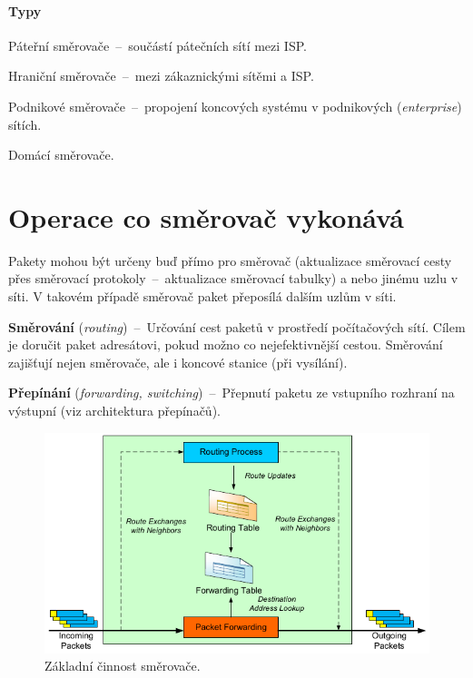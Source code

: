 \paragraph*{Typy} \begin{compactitem}
    \item Páteřní směrovače~--~součástí pátečních sítí mezi ISP.
    \item Hraniční směrovače~--~mezi zákaznickými sítěmi a ISP.
    \item Podnikové směrovače~--~propojení koncových systému v podnikových (\textit{enterprise}) sítích.
    \item Domácí směrovače.
\end{compactitem}


\section{Operace co směrovač vykonává}

Pakety mohou být určeny buď přímo pro směrovač (aktualizace směrovací cesty přes směrovací protokoly~--~aktualizace směrovací tabulky) a nebo jinému uzlu v síti. V takovém případě směrovač paket přeposílá dalším uzlům v síti.

\begin{compactitem}
    \item \textbf{Směrování} (\textit{routing})~--~Určování cest paketů v prostředí počítačových sítí. Cílem je doručit paket adresátovi, pokud možno co nejefektivnější cestou. Směrování zajišťují nejen směrovače, ale i koncové stanice (při vysílání).
    \item \textbf{Přepínání} (\textit{forwarding, switching})~--~Přepnutí paketu ze vstupního rozhraní na výstupní (viz architektura přepínačů).
\end{compactitem}

\begin{figure}[H]
    \centering
    \includegraphics[width=1\linewidth]{smerovac_nakres.pdf}
    \caption{Základní činnost směrovače.}
\end{figure}

